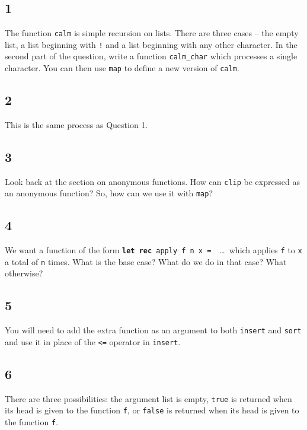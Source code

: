 \documentclass[]{book}
\newcommand\upquote[1]{\textquotesingle#1\textquotesingle}
\begin{document}
\begin{multicols*}{2}
\section*{\\ }
\subsection*{1}
The function \texttt{calm} is simple recursion on lists. There are three cases -- the empty list, a list beginning with \texttt{\upquote{!}} and a list beginning with any other character. In the second part of the question, write a function \texttt{calm\_char} which processes a single character. You can then use \texttt{map} to define a new version of \texttt{calm}.

\subsection*{2}
This is the same process as Question 1.

\subsection*{3}
Look back at the section on anonymous functions. How can \texttt{clip} be expressed as an anonymous function? So, how can we use it with \texttt{map}?

\subsection*{4}
We want a function of the form \texttt{\textbf{let\! rec}\! apply\! f\! n\! x\! =}\ \!\ \ldots\ which applies \texttt{f} to \texttt{x} a total of \texttt{n} times. What is the base case? What do we do in that case? What otherwise?

\subsection*{5}
You will need to add the extra function as an argument to both \texttt{insert} and \texttt{sort} and use it in place of the \texttt{<=} operator in \texttt{insert}.

\subsection*{6}
There are three possibilities: the argument list is empty, \texttt{true} is returned when its head is given to the function \texttt{f}, or \texttt{false} is returned when its head is given to the function \texttt{f}.


\end{multicols*}
\end{document}
